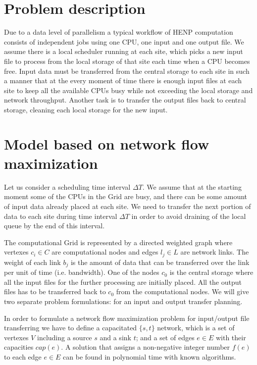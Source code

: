 \documentclass{svjour3}                     %
\begin{document}
\section{Problem description}
\label{problem}
Due to a data level of parallelism a typical workflow of HENP computation
consists of independent jobs using one CPU, one input and one output file. We
assume there is a local scheduler running at each site, which picks a new
input file to process from the local storage of that site each time when a CPU becomes
free. Input data must be transferred from the central storage
to each site in such a manner that at the every moment of time there is enough
input files at each site to keep all the available CPUs busy while not
exceeding the local storage and network throughput. Another task
is to transfer the output files back to central storage, cleaning each local
storage for the new input.

\section{Model based on network flow maximization}
\label{modeling}
Let us consider a scheduling time interval $\Delta T$. We assume that at the
starting moment some of the CPUs in the Grid are busy, and there can be some amount of
input data already placed at each site. We need to transfer the next portion
of data to each site during time interval $\Delta T$ in order to avoid
draining of the local queue by the end of this interval. 

The computational Grid is represented by a directed weighted graph where
vertexes $c_{i} \in C$ are computational nodes and edges $l_{j} \in L$ are
network links. The weight of each link $b_{j}$ is the amount of data that can be
transferred over the link per unit of time (i.e. bandwidth). One of the nodes
$c_{0}$ is the central storage where all the input files for the further
processing are initially placed. All the output files has to be transferred
back to $c_{0}$ from the computational nodes. We will give two separate
problem formulations: for an input and output transfer planning. 

In order to formulate a network flow maximization problem \cite{Network_flows}
for input/output file transferring we have to define a capacitated $\{s,t\}$
network, which is a set of vertexes $V$ including a source $s$ and a sink $t$;
and a set of edges $e\in E$ with their capacities $cap(e)$. A solution that
assigns a non-negative integer number $f(e)$ to each edge $e \in E$ can be
found in polynomial time with known algorithms.
\end{document}
